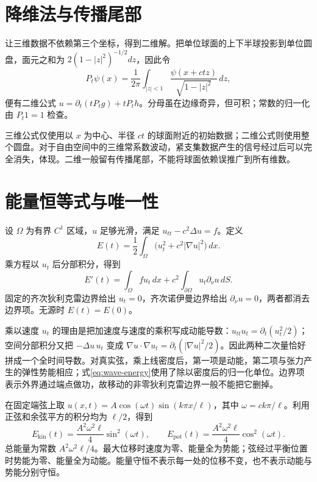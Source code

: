 \documentclass[UTF8,12pt,a4paper,fontset=fandol]{ctexbook}
\begin{document}
\section{降维法与传播尾部}
让三维数据不依赖第三个坐标，得到二维解。把单位球面的上下半球投影到单位圆盘，面元之和为 $2(1-|z|^2)^{-1/2}dz$，因此令
\[
 P_t\psi(x)=\frac1{2\pi}\int_{|z|<1}\frac{\psi(x+ctz)}{\sqrt{1-|z|^2}}\,dz,
\]
便有二维公式 $u=\partial_t(tP_tg)+tP_th$。分母虽在边缘奇异，但可积；常数的归一化由 $P_t1=1$ 检查。

三维公式仅使用以 $x$ 为中心、半径 $ct$ 的球面附近的初始数据；二维公式则使用整个圆盘。对于自由空间中的三维常系数波动，紧支集数据产生的信号经过后可以完全消失，体现。二维一般留有传播尾部，不能将球面依赖误推广到所有维数。

\section{能量恒等式与唯一性}
设 $\Omega$ 为有界 $C^1$ 区域，$u$ 足够光滑，满足 $u_{tt}-c^2\Delta u=f$。定义
\begin{equation}
 E(t)=\frac12\int_\Omega\bigl(u_t^2+c^2|\nabla u|^2\bigr)\,dx.
 \label{eq:wave-energy}
\end{equation}
乘方程以 $u_t$ 后分部积分，得到
\begin{equation}
 E'(t)=\int_\Omega f u_t\,dx+c^2\int_{\partial\Omega}u_t\partial_\nu u\,dS.
 \label{eq:wave-energy-balance}
\end{equation}
固定的齐次狄利克雷边界给出 $u_t=0$，齐次诺伊曼边界给出 $\partial_\nu u=0$，两者都消去边界项。无源时 $E(t)=E(0)$。

乘以速度 $u_t$ 的理由是把加速度与速度的乘积写成动能导数：$u_{tt}u_t=\partial_t(u_t^2/2)$；空间分部积分又把 $-\Delta u\,u_t$ 变成 $\nabla u\cdot\nabla u_t=\partial_t(|\nabla u|^2/2)$。因此两种二次量恰好拼成一个全时间导数。对真实弦，乘上线密度后，第一项是动能，第二项与张力产生的弹性势能相应；式\eqref{eq:wave-energy}使用了除以密度后的归一化单位。边界项表示外界通过端点做功，故移动的非零狄利克雷边界一般不能把它删掉。

\begin{example}[能量在两种形式之间交换]
在固定端弦上取 $u(x,t)=A\cos(\omega t)\sin(k\pi x/\ell)$，其中 $\omega=ck\pi/\ell$。利用正弦和余弦平方的积分均为 $\ell/2$，得到
\[
 E_{\mathrm{kin}}(t)=\frac{A^2\omega^2\ell}{4}\sin^2(\omega t),\qquad
 E_{\mathrm{pot}}(t)=\frac{A^2\omega^2\ell}{4}\cos^2(\omega t).
\]
总能量为常数 $A^2\omega^2\ell/4$。最大位移时速度为零、能量全为势能；弦经过平衡位置时势能为零、能量全为动能。能量守恒不表示每一处的位移不变，也不表示动能与势能分别守恒。
\end{example}
\end{document}
